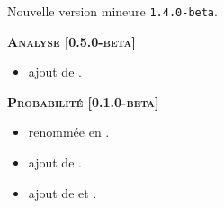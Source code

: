 Nouvelle version mineure \verb+1.4.0-beta+.




\begin{center}
    \textbf{\textsc{Analyse [0.5.0-beta]}}
\end{center}

\begin{itemize}[itemsep=.5em]
    \item {}
          ajout de .

    
\end{itemize}


\separation




\begin{center}
    \textbf{\textsc{Probabilité [0.1.0-beta]}}
\end{center}

\begin{itemize}[itemsep=.5em]
    \item {}
           renommée en  .


    

    \item {}
          ajout de .


    

    \item {}
          ajout de  et .


    

\end{itemize}


\separation
